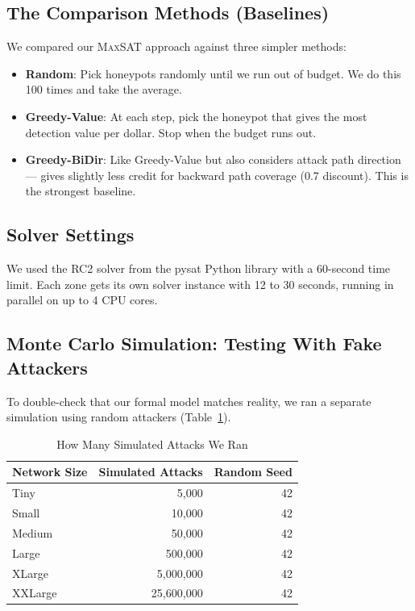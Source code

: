\documentclass[journal]{IEEEtran}
\newcommand{\maxsat}{\textsc{MaxSAT}}
\newcommand{\rcII}{\textsc{RC2}}
\begin{document}
\subsection{The Comparison Methods (Baselines)}

We compared our \maxsat{} approach against three simpler methods:

\begin{itemize}
  \item \textbf{Random}: Pick honeypots randomly until we run out
        of budget. We do this 100 times and take the average.
  \item \textbf{Greedy-Value}: At each step, pick the honeypot that
        gives the most detection value per dollar. Stop when the
        budget runs out.
  \item \textbf{Greedy-BiDir}: Like Greedy-Value but also considers
        attack path direction --- gives slightly less credit for
        backward path coverage (0.7 discount). This is the
        strongest baseline.
\end{itemize}

\subsection{Solver Settings}

We used the \rcII{} solver from the pysat Python library with a
60-second time limit. Each zone gets its own solver instance with
12 to 30 seconds, running in parallel on up to 4 CPU cores.

\subsection{Monte Carlo Simulation: Testing With Fake Attackers}
\label{sec:montecarlo}

To double-check that our formal model matches reality, we ran
a separate simulation using random attackers (Table~\ref{tab:montecarlo}).

\begin{table}[htbp]
\caption{How Many Simulated Attacks We Ran}
\label{tab:montecarlo}
\centering
\renewcommand{\arraystretch}{1.2}
\begin{tabular}{@{}lrr@{}}
\toprule
\textbf{Network Size} & \textbf{Simulated Attacks} & \textbf{Random Seed} \\
\midrule
Tiny    &       5,000 & 42 \\
Small   &      10,000 & 42 \\
Medium  &      50,000 & 42 \\
Large   &     500,000 & 42 \\
XLarge  &   5,000,000 & 42 \\
XXLarge &  25,600,000 & 42 \\
\bottomrule
\end{tabular}
\end{table}
\end{document}
